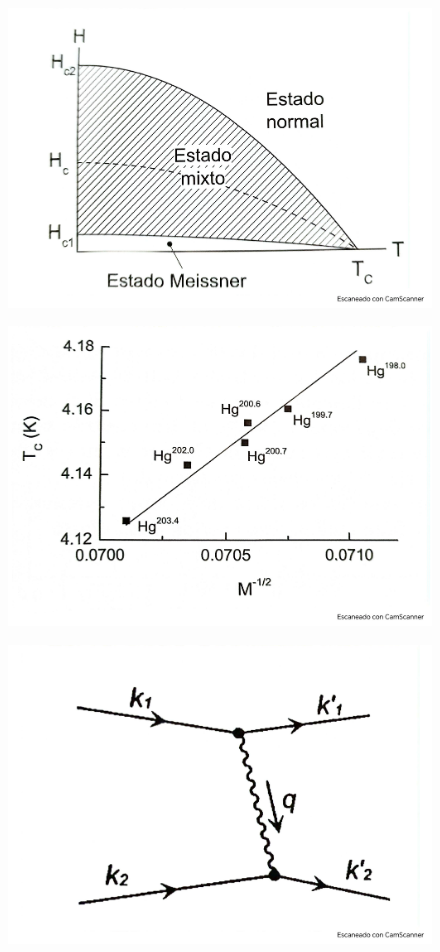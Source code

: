 \begin{figure}[h!] \centering
	\includegraphics[scale=0.5]{Cuerpo/Ch_11/Fotos libro 18.pdf}
	\caption{}
	\label{Fig:11-18}
\end{figure}
\begin{figure}[h!] \centering
	\includegraphics[scale=0.5]{Cuerpo/Ch_11/Fotos libro 19.pdf}
	\caption{}
	\label{Fig:11-19}
\end{figure}
\begin{figure}[h!] \centering
	\includegraphics[scale=0.5]{Cuerpo/Ch_11/Fotos libro 20.pdf}
	\caption{}
	\label{Fig:11-20}
\end{figure}
